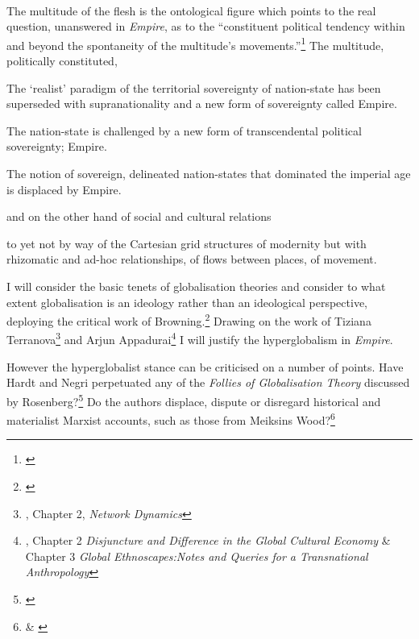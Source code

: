 \paragraph{}The multitude of the flesh is the ontological figure which points to the real question, unanswered in \textit{Empire}, as to the ``constituent political tendency within and beyond the spontaneity of the multitude's movements.''\footnote{\cite[p. 398]{Hardt:2001jl}} The multitude, politically constituted,


The `realist' paradigm of the territorial sovereignty of nation-state has been superseded with supranationality and a new form of sovereignty called Empire.

The nation-state is challenged by a new form of transcendental political sovereignty; Empire.

The notion of sovereign, delineated nation-states that dominated the imperial age is displaced by Empire. 

 and on the other hand of social and cultural relations

to yet not by way of the Cartesian grid structures of modernity but with rhizomatic and ad-hoc relationships, of flows between places, of movement.



I will consider the basic tenets of globalisation theories and consider to what extent globalisation is an ideology rather than an ideological perspective, deploying the critical work of Browning.\footnote{\cite{browning:2005gi}} Drawing on the work of Tiziana Terranova\footnote{\cite{Terranova:2004ly}, Chapter 2, \textit{Network Dynamics}} and Arjun Appadurai\footnote{\cite{Appadurai:1996lp}, Chapter 2 \textit{Disjuncture and Difference in the Global Cultural Economy} \& Chapter 3 \textit{Global Ethnoscapes:Notes and Queries for a Transnational Anthropology}} I will justify the hyperglobalism in \textit{Empire}.

However the hyperglobalist stance can be criticised on a number of points. Have Hardt and Negri perpetuated any of  the \textit{Follies of Globalisation Theory} discussed by Rosenberg?\footnote{\cite{Rosenberg:2000fg}} Do the authors displace, dispute or disregard historical and materialist Marxist accounts, such as those from Meiksins Wood?\footnote{\cite{Wood:2002fu} \& \cite{wood:2003de}}






